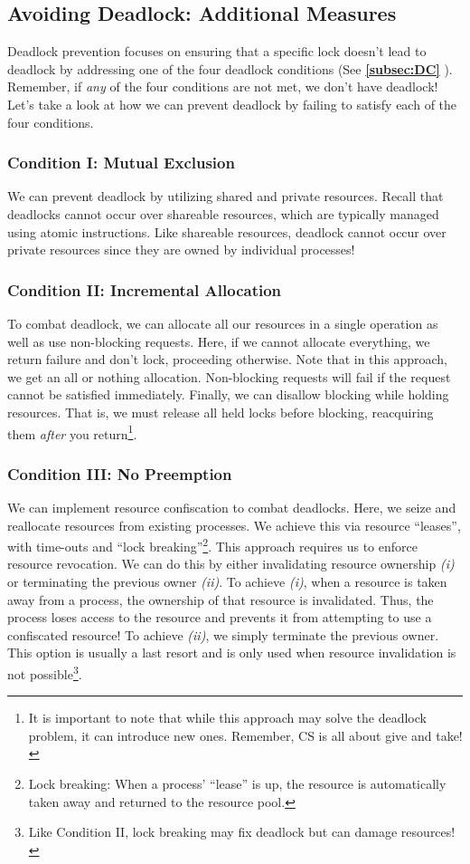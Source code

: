 \documentclass{report}
\newcommand{\refto}[2]{\textbf{\ref{#1:#2} \nameref{#1:#2}}}
\begin{document}
\subsection{Avoiding Deadlock: Additional Measures}
Deadlock prevention focuses on ensuring that a specific lock doesn't lead to deadlock by addressing
one of the four deadlock conditions (See \refto{subsec}{DC}). Remember, if \textit{any} of the four
conditions are not met, we don't have deadlock! Let's take a look at how we can prevent deadlock by
failing to satisfy each of the four conditions.


\subsubsection{Condition I: Mutual Exclusion}
We can prevent deadlock by utilizing shared and private resources. Recall that deadlocks cannot
occur over shareable resources, which are typically managed using atomic instructions. Like
shareable resources, deadlock cannot occur over private resources since they are owned by individual
processes!

\subsubsection{Condition II: Incremental Allocation}
To combat deadlock, we can allocate all our resources in a single operation as well as use
non-blocking requests. Here, if we cannot allocate everything, we return failure and don't
lock, proceeding otherwise. Note that in this approach, we get an all or nothing
allocation. Non-blocking requests will fail if the request cannot be satisfied immediately. Finally,
we can disallow blocking while holding resources. That is, we must release all held locks before
blocking, reacquiring them \textit{after} you return\footnote{It is important to note that while this
approach may solve the deadlock problem, it can introduce new ones. Remember, CS is all about give
and take!}.


\subsubsection{Condition III: No Preemption}
We can implement resource confiscation to combat deadlocks. Here, we seize and reallocate resources
from existing processes. We achieve this via resource ``leases'', with time-outs and ``lock
breaking''\footnote{Lock breaking: When a process' ``lease'' is up, the resource is automatically
  taken away and returned to the resource pool.}. This approach requires us to enforce resource
revocation. We can do this by either invalidating resource ownership \textit{(i)} or terminating the previous
owner \textit{(ii)}. To achieve \textit{(i)}, when a resource is taken away from a process, the
ownership of that resource is invalidated. Thus, the process loses access to the resource and
prevents it from attempting to use a confiscated resource! To achieve \textit{(ii)}, we simply
terminate the previous owner. This option is usually a last resort and is only used when resource
invalidation is not possible\footnote{Like Condition II, lock breaking may fix deadlock but can
  damage resources!}.
\end{document}
